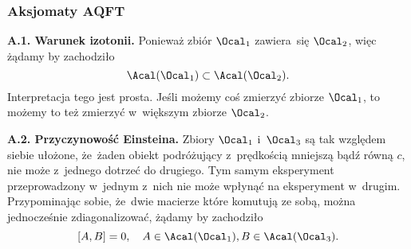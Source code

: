 \documentclass[10pt,t]{beamer}
\begin{document}
\begin{frame}
  \frametitle{Aksjomaty AQFT}


  \textbf{A.1. Warunek izotonii.} Ponieważ zbiór $\Ocal_{ 1 }$ zawiera~się
  $\Ocal_{ 2 }$, więc żądamy by zachodziło
  \begin{equation}
    \label{eq:Niespodziewane-teoretyczne-01}
    \Acal( \Ocal_{ 1 } ) \subset \Acal( \Ocal_{ 2 } ).
  \end{equation}
  Interpretacja tego jest prosta. Jeśli możemy coś zmierzyć zbiorze
  $\Ocal_{ 1 }$, to możemy to też zmierzyć w~większym zbiorze $\Ocal_{ 2 }$.

  \textbf{A.2. Przyczynowość Einsteina.} Zbiory $\Ocal_{ 1 }$ i~$\Ocal_{ 3 }$
  są tak względem siebie ułożone, że~żaden obiekt podróżujący z~prędkością
  mniejszą bądź równą $c$, nie może z~jednego dotrzeć do drugiego. Tym
  samym eksperyment przeprowadzony w~jednym z~nich nie może wpłynąć na
  eksperyment w~drugim. Przypominając sobie, że~dwie macierze które
  komutują ze sobą, można jednocześnie zdiagonalizować, żądamy by zachodziło
  \begin{equation}
    \label{eq:Niespodziewane-teoretyczne-01}
    [ A, B ] = 0, \quad
    A \in \Acal( \Ocal_{ 1 } ), B \in \Acal( \Ocal_{ 3 } ).
  \end{equation}

\end{frame}
\end{document}
